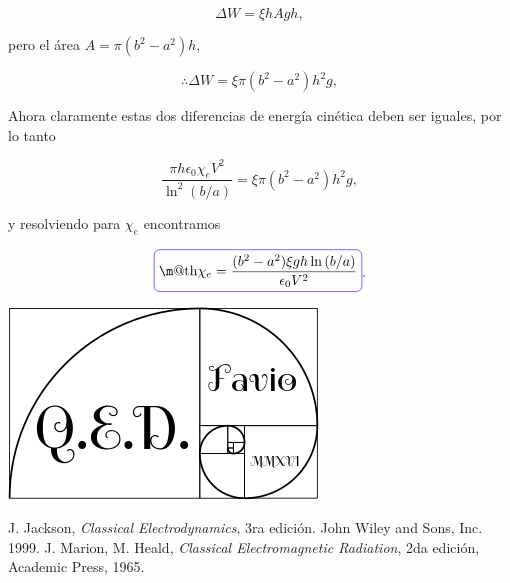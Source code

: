 \documentclass[a4paper,11pt]{article}
\makeatletter
\numberwithin{equation}{section}
\newcommand*{\boxcolor}{blue}
\renewcommand{\boxed}[1]{\textcolor{\boxcolor}{%
\tikz[baseline={([yshift=-1ex]current bounding box.center)}] \node [rectangle, minimum width=1ex,rounded corners,draw] {\normalcolor\m@th$\displaystyle#1$};}}
\makeatother
\begin{document}
\begin{equation}
 \Delta W = \xi h A gh,
\end{equation}

pero el área $A = \pi(b^2 - a^2)h$, 

\begin{equation}
 \therefore \Delta W = \xi \pi(b^2 - a^2)h^2 g,
\end{equation}

Ahora claramente estas dos diferencias de energía cinética deben ser iguales, por lo 
tanto 

\begin{equation}
  \frac{\pi h \epsilon_0 \chi_e V^2}{\ln^2{(b/a)}} = \xi \pi(b^2 - a^2)h^2 g,
\end{equation}

y resolviendo para $\chi_e$ encontramos 

\begin{equation}
 \boxed{\chi_e = \frac{(b^2 - a^2)\xi g h \ln{(b/a)}}{\epsilon_0 V^2}}.
\end{equation}

\hspace{10cm}\includegraphics[scale=0.25]{logoQED}

\newpage

\begin{thebibliography}{10}
J. Jackson, \emph{Classical Electrodynamics}, 3ra edición. John Wiley and Sons, Inc. 
1999.
J. Marion, M. Heald, \emph{Classical Electromagnetic Radiation}, 2da edición, Academic 
Press, 1965.
\end{thebibliography}
\end{document}

